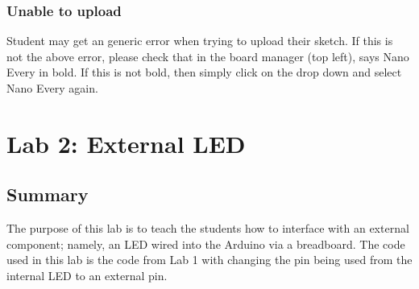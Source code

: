 \documentclass[11pt,a4paper]{article}
\begin{document}
\subsubsection*{Unable to upload}
Student may get an generic error when trying to upload their sketch. If this is not the above error, please check that in the board manager (top left), says Nano Every in bold. If this is not bold, then simply click on the drop down and select Nano Every again.

\newpage
\section*{Lab 2: External LED}
\subsection*{Summary}
The purpose of this lab is to teach the students how to interface with an external component; namely, an LED wired into the Arduino via a breadboard. The code used in this lab is the code from Lab 1 with changing the pin being used from the internal LED to an external pin.
\end{document}
